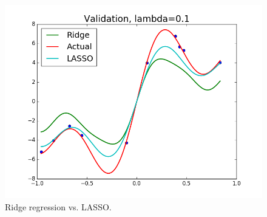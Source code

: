 \documentclass{article}
\begin{document}
\begin{figure}[width=\linewidth]
\begin{multicols}{2}
  \includegraphics[width=1.2\linewidth]{code/P4/validation,ridge.png}
\end{multicols}
\caption{Ridge regression vs. LASSO.}
\end{figure}
\end{document}

